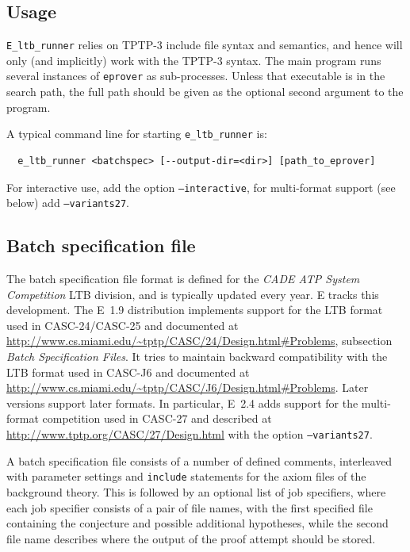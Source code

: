 \documentclass{report}
\begin{document}
\subsection{Usage}

\texttt{E\_ltb\_runner} relies on TPTP-3 include file syntax and
semantics, and hence will only (and implicitly) work with the TPTP-3
syntax. The main program runs several instances of \texttt{eprover} as
sub-processes. Unless that executable is in the search path, the full
path should be given as the optional second argument to the
program.

A typical command line for starting \texttt{e\_ltb\_runner} is:

\begin{verbatim}
  e_ltb_runner <batchspec> [--output-dir=<dir>] [path_to_eprover]
\end{verbatim}

For interactive use, add the option \texttt{--interactive}, for
multi-format support (see below) add \texttt{--variants27}.


\subsection{Batch specification file}
\label{sec:bsf}

The batch specification file format is defined for the \emph{CADE ATP
  System Competition} LTB division, and is typically updated every
year. E tracks this development. The E~1.9 distribution implements
support for the LTB format used in CASC-24/CASC-25 and documented at
\url{http://www.cs.miami.edu/~tptp/CASC/24/Design.html#Problems},
subsection \emph{Batch Specification Files}. It tries to maintain
backward compatibility with the LTB format used in CASC-J6 and
documented at
\url{http://www.cs.miami.edu/~tptp/CASC/J6/Design.html#Problems}. Later
versions support later formats. In particular, E~2.4 adds support for
the multi-format competition used in CASC-27 and described at
\url{http://www.tptp.org/CASC/27/Design.html} with the option
\texttt{--variants27}.

A batch specification file consists of a number of defined comments,
interleaved with parameter settings and \texttt{include} statements
for the axiom files of the background theory. This is followed by an
optional list of job specifiers, where each job specifier consists of
a pair of file names, with the first specified file containing the
conjecture and possible additional hypotheses, while the second file
name describes where the output of the proof attempt should be stored.
\end{document}
